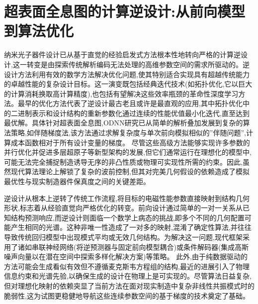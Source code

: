 \section{超表面全息图的计算逆设计:从前向模型到算法优化}\label{ux8d85ux8868ux9762ux5168ux606fux56feux7684ux8ba1ux7b97ux9006ux8bbeux8ba1ux4eceux524dux5411ux6a21ux578bux5230ux7b97ux6cd5ux4f18ux5316}

纳米光子器件设计已从基于直觉的经验启发式方法根本性地转向严格的计算逆设计,这一转变是由探索传统解析编码无法处理的高维参数空间的需求所驱动的。逆设计方法利用有效的数学方法解决优化问题,使其特别适合实现具有超越传统能力的卓越性能的复杂设计目标。这一演变既包括经典迭代技术(如拓扑优化,它以巨大的计算消耗换取高计算精度),也包括有望解决这些效率瓶颈的革命性深度学习方法。最早的优化方法代表了逆设计最古老且或许是最直观的应用,其中拓扑优化中的二进制表示和设计结构的重新参数化通过连续的性能优值最小化迭代,直至达到最优解。具体针对超表面全息图,ODNN研究已从简单的解析叠加发展到复杂的算法策略,如伴随梯度法,该方法通过求解复杂度与单次前向模拟相似的''伴随问题'',计算成本函数相对于所有设计变量的梯度。\citep{doi_10_48550_arxiv_2603_15210_fdcfb92f} \citep{doi_10_1038_s41598_024_67142_2_db612126} 尽管这些高级方法能够实现许多参数的并行优化并促进多层超原子等新型架构的发展,但它们通常运行在理想化的模型中,可能无法完全捕捉制造诱导无序的非凸性质或物理可实现性所需的约束。因此,虽然现代算法理论上解锁了复杂的波前控制,但其对完美几何假设的依赖造成了模拟最优性与现实制造器件保真度之间的关键差距。\citep{doi_10_1088_1361_6439_ad3a72_72d60f33} \citep{doi_10_1364_oe_27_030308_704a1c9b} \citep{s2_76a83ea3baed75ad88b7f0782eb9a694a330c853_cee16cac} \citep{doi_10_1515_nanoph_2021_0660_2d91a441}

逆设计从根本上逆转了传统工作流程,将目标的电磁性能参数直接映射到结构几何形状,标志着从经验直觉向严格优化的转变。前向设计通过简单的一对一关系从已知结构预测响应,而逆设计则面临一个数学上病态的挑战,即多个不同的几何配置可能产生相同的光谱。这种非唯一性造成了一对多的映射,混淆了确定性算法,并往往导致传统回归模型中出现模式平均或无效几何结构。为解决这一问题,现代框架采用了诸如串联神经网络(将逆预测器与固定前向模型耦合)或条件解码器(集成高斯噪声向量以在潜在空间中探索多样化解决方案)等策略。\citep{doi_10_1364_josab_497661_d333080a} \citep{doi_10_1038_s41467_025_57516_z_7c69e056} 此外,由于纯数据驱动的方法可能会生成看似有效但不遵循麦克斯韦方程组的结构,最近的进展引入了物理信息约束和光谱先验,以确保生成的设计在物理上是可实现的。尽管算法日益复杂,但对理想化映射的依赖突显了当前方法在面对现实制造中复杂非线性共振模式时的脆弱性,这为试图更稳健地导航这些连续参数空间的基于梯度的技术奠定了基础。\citep{doi_10_1088_1361_6463_ad3e05_d24e0a0a} \citep{doi_10_23919_piers_fall62445_2025_11394631_4fdb8517} \citep{doi_10_71465_fapm546_bda368a5}

